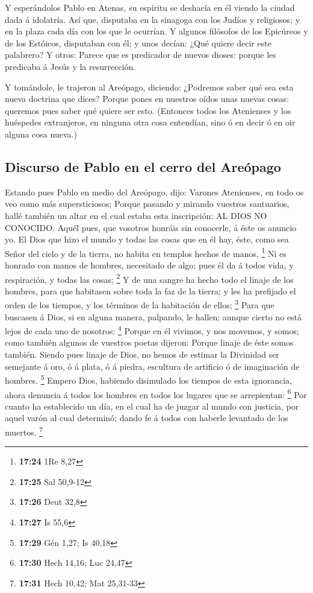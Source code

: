  Y esperándolos Pablo en Atenas, su espíritu se deshacía en
él viendo la ciudad dada á idolatría.  Así que, disputaba
en la sinagoga con los Judíos y religiosos; y en la plaza cada día con
los que le ocurrían.  Y algunos filósofos de los Epicúreos
y de los Estóicos, disputaban con él; y unos decían: ¿Qué quiere decir
este palabrero? Y otros: Parece que es predicador de nuevos dioses:
porque les predicaba á Jesús y la resurrección.

 Y tomándole, le trajeron al Areópago, diciendo: ¿Podremos
saber qué sea esta nueva doctrina que dices?  Porque pones
en nuestros oídos unas nuevas cosas: queremos pues saber qué quiere ser
esto.  (Entonces todos los Atenienses y los huéspedes
extranjeros, en ninguna otra cosa entendían, sino ó en decir ó en oir
alguna cosa nueva.)

\hypertarget{discurso-de-pablo-en-el-cerro-del-areuxf3pago}{%
\subsection{Discurso de Pablo en el cerro del
Areópago}\label{discurso-de-pablo-en-el-cerro-del-areuxf3pago}}

 Estando pues Pablo en medio del Areópago, dijo: Varones
Atenienses, en todo os veo como más supersticiosos;  Porque
pasando y mirando vuestros santuarios, hallé también un altar en el cual
estaba esta inscripción: AL DIOS NO CONOCIDO. Aquél pues, que vosotros
honráis sin conocerle, á éste os anuncio yo.  El Dios que
hizo el mundo y todas las cosas que en él hay, éste, como sea Señor del
cielo y de la tierra, no habita en templos hechos de manos, \footnote{\textbf{17:24}
  1Re 8,27}  Ni es honrado con manos de hombres, necesitado
de algo; pues él da á todos vida, y respiración, y todas las cosas;
\footnote{\textbf{17:25} Sal 50,9-12}  Y de una sangre ha
hecho todo el linaje de los hombres, para que habitasen sobre toda la
faz de la tierra; y les ha prefijado el orden de los tiempos, y los
términos de la habitación de ellos; \footnote{\textbf{17:26} Deut 32,8}
 Para que buscasen á Dios, si en alguna manera, palpando,
le hallen; aunque cierto no está lejos de cada uno de nosotros:
\footnote{\textbf{17:27} Is 55,6}  Porque en él vivimos, y
nos movemos, y somos; como también algunos de vuestros poetas dijeron:
Porque linaje de éste somos también.  Siendo pues linaje de
Dios, no hemos de estimar la Divinidad ser semejante á oro, ó á plata, ó
á piedra, escultura de artificio ó de imaginación de hombres.
\footnote{\textbf{17:29} Gén 1,27; Is 40,18}  Empero Dios,
habiendo disimulado los tiempos de esta ignorancia, ahora denuncia á
todos los hombres en todos los lugares que se arrepientan: \footnote{\textbf{17:30}
  Hech 14,16; Luc 24,47}  Por cuanto ha establecido un día,
en el cual ha de juzgar al mundo con justicia, por aquel varón al cual
determinó; dando fe á todos con haberle levantado de los muertos.
\footnote{\textbf{17:31} Hech 10,42; Mat 25,31-33}

